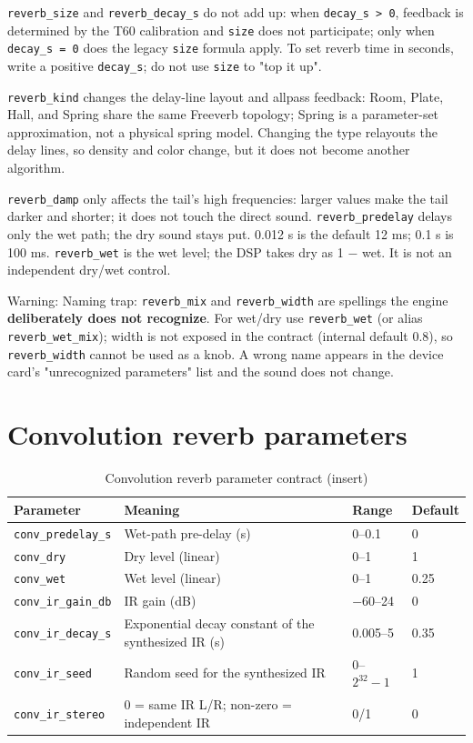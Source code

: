 \texttt{reverb\_size} and \texttt{reverb\_decay\_s} do not add up: when \texttt{decay\_s > 0}, feedback is determined by the T60 calibration and \texttt{size} does not participate; only when \texttt{decay\_s = 0} does the legacy \texttt{size} formula apply. To set reverb time in seconds, write a positive \texttt{decay\_s}; do not use \texttt{size} to "top it up".

\texttt{reverb\_kind} changes the delay-line layout and allpass feedback: Room, Plate, Hall, and Spring share the same Freeverb topology; Spring is a parameter-set approximation, not a physical spring model. Changing the type relayouts the delay lines, so density and color change, but it does not become another algorithm.

\texttt{reverb\_damp} only affects the tail's high frequencies: larger values make the tail darker and shorter; it does not touch the direct sound. \texttt{reverb\_predelay} delays only the wet path; the dry sound stays put. 0.012 s is the default 12 ms; 0.1 s is 100 ms. \texttt{reverb\_wet} is the wet level; the DSP takes dry as 1 − wet. It is not an independent dry/wet control.

Warning: Naming trap: \texttt{reverb\_mix} and \texttt{reverb\_width} are spellings the engine \textbf{deliberately does not recognize}. For wet/dry use \texttt{reverb\_wet} (or alias \texttt{reverb\_wet\_mix}); width is not exposed in the contract (internal default 0.8), so \texttt{reverb\_width} cannot be used as a knob. A wrong name appears in the device card's "unrecognized parameters" list and the sound does not change.

\section{Convolution reverb parameters}

\begin{table}[htbp]
\centering
\small
\begin{tabular}{@{}llll@{}}
\hline
Parameter & Meaning & Range & Default \\
\hline
\texttt{conv\_predelay\_s} & Wet-path pre-delay (s) & 0–0.1 & 0 \\
\texttt{conv\_dry} & Dry level (linear) & 0–1 & 1 \\
\texttt{conv\_wet} & Wet level (linear) & 0–1 & 0.25 \\
\texttt{conv\_ir\_gain\_db} & IR gain (dB) & −60–24 & 0 \\
\texttt{conv\_ir\_decay\_s} & Exponential decay constant of the synthesized IR (s) & 0.005–5 & 0.35 \\
\texttt{conv\_ir\_seed} & Random seed for the synthesized IR & $0$–$2^{32}-1$ & 1 \\
\texttt{conv\_ir\_stereo} & 0 = same IR L/R; non-zero = independent IR & 0/1 & 0 \\
\hline
\end{tabular}
\caption{Convolution reverb parameter contract (insert)}
\label{tab:conv-params}
\end{table}

